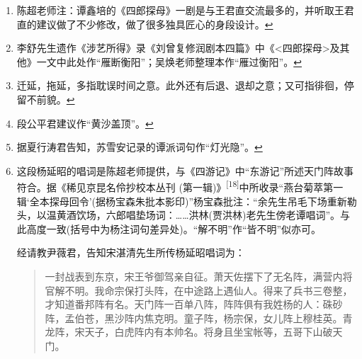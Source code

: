 \begin{enumerate}
  \begin{quote}
  杨延昭
  【西皮快板】穆桂英在帐中夸口甚大，我这里取天书仔细观察。看一看九曜星临凡托化，或生男或生女报效皇家。玉皇差天魔女把凡来下，托化了穆桂英不错不差。
  \end{quote}

  (焦赞 你看这上头有穆桂英。)

  杨延昭 【西皮摇板】穆桂英，我那聪明伶俐的儿啊，

  \begin{quote}
  杨延昭
  【西皮快板】你不该将为父枪挑马下，宋营中大小将活活笑煞。罢罢罢将人情暂且准下，(坐下)念兹在进宝的功饶恕这冤家。
  \end{quote}

  \protect\hyperlink{fnref463}{↩}
\item
  \leavevmode\hypertarget{fn464}{}%
  陈超老师注：谭鑫培的《四郎探母》一剧是与王君直交流最多的，并听取王君直的建议做了不少修改，做了很多独具匠心的身段设计。\protect\hyperlink{fnref464}{↩}
\item
  \leavevmode\hypertarget{fn465}{}%
  李舒先生遗作《涉艺所得》录《刘曾复修润剧本四篇》中《\textless{}四郎探母\textgreater{}及其他》一文中此处作``雁断衡阳''；吴焕老师整理本作``雁过衡阳''。\protect\hyperlink{fnref465}{↩}
\item
  \leavevmode\hypertarget{fn466}{}%
  迁延，拖延，多指耽误时间之意。此外还有后退、退却之意；又可指徘徊，停留不前貌。\protect\hyperlink{fnref466}{↩}
\item
  \leavevmode\hypertarget{fn467}{}%
  段公平君建议作``黄沙盖顶''。\protect\hyperlink{fnref467}{↩}
\item
  \leavevmode\hypertarget{fn468}{}%
  据夏行涛君告知，苏雪安记录的谭派词句作``灯光隐''。\protect\hyperlink{fnref468}{↩}
\item
  \leavevmode\hypertarget{fn469}{}%
  这段杨延昭的唱词是陈超老师提供，与《四游记》中``东游记''所述天门阵故事符合。据《稀见京昆名伶抄校本丛刊
  (第一辑)》\textsuperscript{{[}18{]}}中所收录``燕台菊萃第一辑`全本探母回令'(据杨宝森朱批本影印)''杨宝森批注：``余先生吊毛下场重新勒头，以温黄酒饮场，六郎唱垫场词：\ldots{}\ldots{}洪林(贾洪林)老先生傍老谭唱词''。与此高度一致(括号中为杨注词句差异处)。``解不明''作``皆不明''似亦可。

  经请教尹薇君，告知宋湛清先生所传杨延昭唱词为：

  \begin{quote}
  一封战表到东京，宋王爷御驾亲自征。萧天佐摆下了无名阵，满营内将官解不明。我命宗保打头阵，在中途路上遇仙人。得来了兵书三卷整，才知道番邦阵有名。天门阵一百单八阵，阵阵俱有我姓杨的人：硃砂阵，孟伯苍，黑沙阵内焦克明。童子阵，杨宗保，女儿阵上穆桂英。青龙阵，宋天子，白虎阵内有本帅名。将身且坐宝帐等，五哥下山破天门。
  \end{quote}


\end{enumerate}

